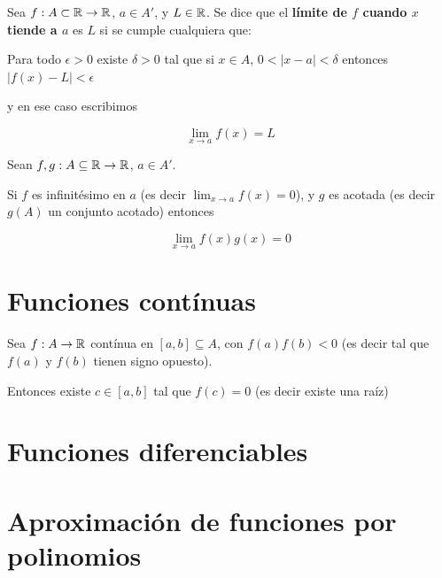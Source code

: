 \begin{definition}[Límite] \label{limite_r}
Sea $f : A \subset \mathbb{R} \to \mathbb{R}$, $ a \in A'$, y $L \in \mathbb{R}$.  Se dice que el \textbf{límite de $f$ cuando $x$ tiende a $a$}  es $L$ si se cumple cualquiera que:

Para todo $\epsilon > 0$ existe $\delta > 0$ tal que si $x \in A$, $0 < |x-a| < \delta$ entonces $|f(x) - L| < \epsilon$

y en ese caso escribimos

$$ \displaystyle \lim_{x \to a} f(x) = L $$
\end{definition}


\begin{theorem} \label{cero_por_acotada}
Sean $f,g:A \subseteq \mathbb{R} \to \mathbb{R}$, $a \in A'$.

Si $f$ es infinitésimo en $a$ (es decir $ \lim_{x \to a} f(x) = 0$), y $g$ es acotada (es decir $g(A)$ un conjunto acotado) entonces

$$ \lim_{x \to a} f(x)g(x) = 0 $$
\end{theorem}



\chapter{Funciones contínuas}


\begin{theorem}[Bolzano]
Sea $f : A \to \mathbb{R}$ contínua en $[a,b] \subseteq A$, con $f(a) f(b) < 0$ (es decir tal que $f(a)$ y $f(b)$ tienen signo opuesto).

Entonces existe $c \in [a,b]$ tal que $f(c) = 0$ (es decir existe una raíz)
\end{theorem}









\chapter{Funciones diferenciables}

\chapter{Aproximación de funciones por polinomios}


